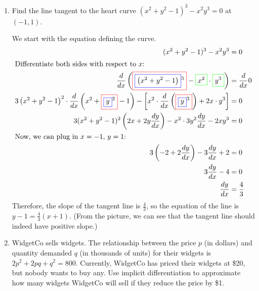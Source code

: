 \documentclass[main]{subfiles}
\begin{document}
\begin{enumerate}[resume]
\begin{enumerate}
\end{enumerate}

\pspace{\newpage}

\item
    
  \begin{problem}
    Find the line tangent to the heart curve $(x^2 + y^2 - 1)^3 - x^2 y^3
    = 0$ at $(-1, 1)$.
  \end{problem}
    \pspace{\vfill}

  \begin{solution}    
    We start with the equation defining the curve.
    \begin{align*}
      (x^2 + y^2 - 1)^3 - x^2 y^3 &= 0 \\
      \intertext{Differentiate both sides with respect to $x$:}
      \frac{d}{dx} \left(\fcolorbox{red}{white}{$\displaystyle
          \fcolorbox{blue}{white}{$\displaystyle  \left(x^ { 2} + y^ { 2}
              -1\right)$}^ { 3} $}-
        \fcolorbox{green}{white}{$\displaystyle  x^ { 2} $}\cdot
        \fcolorbox{green}{white}{$\displaystyle  y^ { 3} $}\right) &=
      \frac{d}{dx} 0 \\
      3 \left(x^ { 2} + y^ { 2} -1\right)^ { 2} \cdot \frac{d}{dx}\left(x^
        { 2} + \fcolorbox{red}{white}{$\displaystyle \fcolorbox{blue}{white}{$\displaystyle  y$}^ { 2} $} -1\right)-\left[x^ { 2} \cdot \frac{d}{dx}
        \left(\fcolorbox{red}{white}{$\displaystyle
            \fcolorbox{blue}{white}{$\displaystyle  y$}^ { 3} $}\right)+
        2 x\cdot y^ { 3} \right] &= 0 \\
      3 (x^2 + y^2 - 1)^2 \left( 2x + 2y \frac{dy}{dx} \right) - x^2 \cdot
      3 y^2
      \frac{dy}{dx} - 2x y^3 &= 0 \\
      \intertext{Now, we can plug in $x = -1$,
        $y = 1$:}
      3 \left(-2 + 2 \frac{dy}{dx} \right) - 3 \frac{dy}{dx} +
      2 &= 0 \\
      3 \frac{dy}{dx} - 4 &= 0 \\
      \frac{dy}{dx} &= \frac{4}{3}
    \end{align*}
    Therefore, the slope of the tangent line is $\frac{4}{3}$, so the
    equation of the line is $\boxed{y - 1 = \frac{4}{3} (x + 1)}$.  (From
    the picture, we can see that the tangent line should indeed have
    positive slope.)
  \end{solution}


\item 
\begin{problem}
    WidgetCo sells widgets. The relationship between the price $p$ (in dollars) and quantity demanded $q$ (in thousands of units) for their widgets is $2p^2+2pq+q^2=800$. Currently, WidgetCo has priced their widgets at \$20, but nobody wants to buy any.
    Use implicit differentiation to approximate how many widgets WidgetCo will sell if they reduce the price by \$1. 
\end{problem}
\pspace{\vfill}


\end{enumerate}
\end{document}
